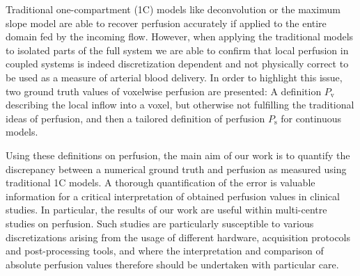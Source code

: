 \documentclass[10pt]{article}
\begin{document}
Traditional one-compartment (1C) models like deconvolution or the maximum slope model are able to recover perfusion accurately if applied to the entire domain fed by the incoming flow. However, when applying the traditional models to isolated parts of the full system we are able to confirm that local perfusion in coupled systems is indeed discretization dependent and not physically correct to be used as a measure of arterial blood delivery. In order to highlight this issue, two ground truth values of voxelwise perfusion are presented: A definition $P_{\mathrm{v}}$ describing the local inflow into a voxel, but otherwise not fulfilling the traditional ideas of perfusion, and then a tailored definition of perfusion $P_{\mathrm{s}}$ for continuous models. 
	
Using these definitions on perfusion, the main aim of our work is to quantify the discrepancy between a numerical ground truth and perfusion as measured using traditional 1C models. A thorough quantification of the error is valuable information for a critical interpretation of obtained perfusion values in clinical studies. In particular, the results of our work are useful within multi-centre studies on perfusion. Such studies are particularly susceptible to various discretizations arising from the usage of different hardware, acquisition protocols and post-processing tools, and where the interpretation and comparison of absolute perfusion values therefore should be undertaken with particular care.
	
		
\end{document}
